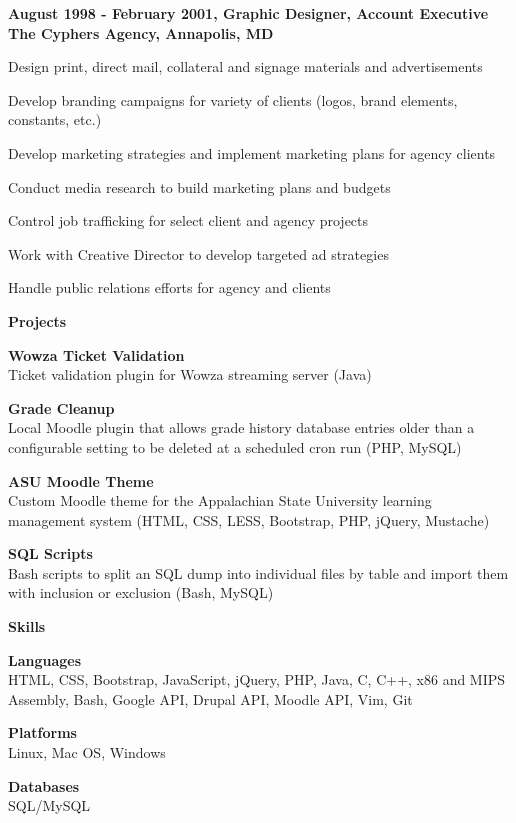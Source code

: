\documentclass[letterpaper,10pt,final]{memoir}
\newcommand{\Sep}{\vspace{1.5em}}
\newcommand{\SmallSep}{\vspace{0.5em}}
\newcommand{\CVSection}[1]
	{\Large\textbf{#1}\par
	\SmallSep\normalsize\normalfont}
\newcommand{\CVItem}[1]
	{\textbf{\color{BrickRed} #1}}
\begin{document}
\CVItem{August 1998 - February 2001, Graphic Designer, Account Executive\\
The Cyphers Agency, Annapolis, MD}
\begin{compactitem}[\color{BrickRed}$\circ$]
	\item Design print, direct mail, collateral and signage materials and advertisements
	\item Develop branding campaigns for variety of clients (logos, brand elements, constants, etc.)
	\item Develop marketing strategies and implement marketing plans for agency clients
	\item Conduct media research to build marketing plans and budgets
	\item Control job trafficking for select client and agency projects
	\item Work with Creative Director to develop targeted ad strategies
	\item Handle public relations efforts for agency and clients
\end{compactitem}
\Sep

\CVSection{Projects}
\CVItem{Wowza Ticket Validation}\\
Ticket validation plugin for Wowza streaming server (Java)
\SmallSep

\CVItem{Grade Cleanup}\\
Local Moodle plugin that allows grade history database entries older than a configurable setting to be deleted at a scheduled cron run (PHP, MySQL)
\SmallSep

\CVItem{ASU Moodle Theme}\\
Custom Moodle theme for the Appalachian State University learning management system (HTML, CSS, LESS, Bootstrap, PHP, jQuery, Mustache)
\SmallSep

\CVItem{SQL Scripts}\\
Bash scripts to split an SQL dump into individual files by table and import them with inclusion or exclusion (Bash, MySQL)
\Sep

\CVSection{Skills}
\CVItem{Languages}\\
HTML, CSS, Bootstrap, JavaScript, jQuery, PHP, Java, C, C++, x86 and MIPS Assembly, Bash, Google API, Drupal API, Moodle API, Vim, Git
\SmallSep

\CVItem{Platforms}\\
Linux, Mac OS, Windows
\SmallSep

\CVItem{Databases}\\
SQL/MySQL
\SmallSep
\end{document}
